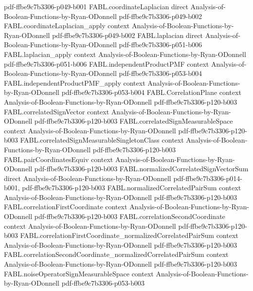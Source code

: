 \begin{theorem}
  {pdf-ffbe9c7b3306-p049-b001}
\proofstep
  {FABL.coordinateLaplacian}
  {direct}
  {Analysis-of-Boolean-Functions-by-Ryan-ODonnell}
  {pdf-ffbe9c7b3306-p049-b002}
\proofstep
  {FABL.coordinateLaplacian_apply}
  {context}
  {Analysis-of-Boolean-Functions-by-Ryan-ODonnell}
  {pdf-ffbe9c7b3306-p049-b002}
\proofstep
  {FABL.laplacian}
  {direct}
  {Analysis-of-Boolean-Functions-by-Ryan-ODonnell}
  {pdf-ffbe9c7b3306-p051-b006}
\proofstep
  {FABL.laplacian_apply}
  {context}
  {Analysis-of-Boolean-Functions-by-Ryan-ODonnell}
  {pdf-ffbe9c7b3306-p051-b006}
\proofstep
  {FABL.independentProductPMF}
  {context}
  {Analysis-of-Boolean-Functions-by-Ryan-ODonnell}
  {pdf-ffbe9c7b3306-p053-b004}
\proofstep
  {FABL.independentProductPMF_apply}
  {context}
  {Analysis-of-Boolean-Functions-by-Ryan-ODonnell}
  {pdf-ffbe9c7b3306-p053-b004}
\proofstep
  {FABL.CorrelationPlane}
  {context}
  {Analysis-of-Boolean-Functions-by-Ryan-ODonnell}
  {pdf-ffbe9c7b3306-p120-b003}
\proofstep
  {FABL.correlatedSignVector}
  {context}
  {Analysis-of-Boolean-Functions-by-Ryan-ODonnell}
  {pdf-ffbe9c7b3306-p120-b003}
\proofstep
  {FABL.correlatedSignMeasurableSpace}
  {context}
  {Analysis-of-Boolean-Functions-by-Ryan-ODonnell}
  {pdf-ffbe9c7b3306-p120-b003}
\proofstep
  {FABL.correlatedSignMeasurableSingletonClass}
  {context}
  {Analysis-of-Boolean-Functions-by-Ryan-ODonnell}
  {pdf-ffbe9c7b3306-p120-b003}
\proofstep
  {FABL.pairCoordinatesEquiv}
  {context}
  {Analysis-of-Boolean-Functions-by-Ryan-ODonnell}
  {pdf-ffbe9c7b3306-p120-b003}
\proofstep
  {FABL.normalizedCorrelatedSignVectorSum}
  {direct}
  {Analysis-of-Boolean-Functions-by-Ryan-ODonnell}
  {pdf-ffbe9c7b3306-p014-b001,
    pdf-ffbe9c7b3306-p120-b003}
\proofstep
  {FABL.normalizedCorrelatedPairSum}
  {context}
  {Analysis-of-Boolean-Functions-by-Ryan-ODonnell}
  {pdf-ffbe9c7b3306-p120-b003}
\proofstep
  {FABL.correlationFirstCoordinate}
  {context}
  {Analysis-of-Boolean-Functions-by-Ryan-ODonnell}
  {pdf-ffbe9c7b3306-p120-b003}
\proofstep
  {FABL.correlationSecondCoordinate}
  {context}
  {Analysis-of-Boolean-Functions-by-Ryan-ODonnell}
  {pdf-ffbe9c7b3306-p120-b003}
\proofstep
  {FABL.correlationFirstCoordinate_normalizedCorrelatedPairSum}
  {context}
  {Analysis-of-Boolean-Functions-by-Ryan-ODonnell}
  {pdf-ffbe9c7b3306-p120-b003}
\proofstep
  {FABL.correlationSecondCoordinate_normalizedCorrelatedPairSum}
  {context}
  {Analysis-of-Boolean-Functions-by-Ryan-ODonnell}
  {pdf-ffbe9c7b3306-p120-b003}
\proofstep
  {FABL.noiseOperatorSignMeasurableSpace}
  {context}
  {Analysis-of-Boolean-Functions-by-Ryan-ODonnell}
  {pdf-ffbe9c7b3306-p053-b003}

\end{theorem}
